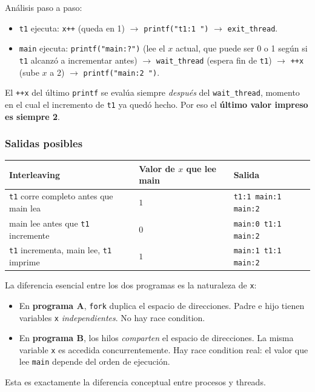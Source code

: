 \documentclass[11pt,a4paper]{article}
\begin{document}
Análisis paso a paso:

\begin{itemize}[leftmargin=*]
    \item \texttt{t1} ejecuta: \texttt{x++} (queda en 1) $\to$
        \texttt{printf("t1:1 ")} $\to$ \texttt{exit\_thread}.
    \item \texttt{main} ejecuta: \texttt{printf("main:?")} (lee el
        $x$ actual, que puede ser 0 o 1 según si \texttt{t1} alcanzó
        a incrementar antes) $\to$ \texttt{wait\_thread} (espera fin
        de \texttt{t1}) $\to$ \texttt{++x} (sube $x$ a 2) $\to$
        \texttt{printf("main:2 ")}.
\end{itemize}

El \texttt{++x} del último \texttt{printf} se evalúa siempre
\emph{después} del \texttt{wait\_thread}, momento en el cual el
incremento de \texttt{t1} ya quedó hecho. Por eso el \textbf{último
valor impreso es siempre 2}.

\subsubsection*{Salidas posibles}

\begin{center}
\small
\begin{tabular}{@{}lll@{}}
\toprule
Interleaving & Valor de $x$ que lee main & Salida \\
\midrule
\texttt{t1} corre completo antes que main lea  & $1$ & \texttt{t1:1 main:1 main:2\ } \\
main lee antes que \texttt{t1} incremente      & $0$ & \texttt{main:0 t1:1 main:2\ } \\
\texttt{t1} incrementa, main lee, \texttt{t1} imprime & $1$ & \texttt{main:1 t1:1 main:2\ } \\
\bottomrule
\end{tabular}
\end{center}

\begin{importante}
La diferencia esencial entre los dos programas es la naturaleza de
\texttt{x}:

\begin{itemize}[leftmargin=*,nosep]
    \item En \textbf{programa A}, \texttt{fork} duplica el espacio de
        direcciones. Padre e hijo tienen variables \texttt{x}
        \emph{independientes}. No hay race condition.
    \item En \textbf{programa B}, los hilos \emph{comparten} el
        espacio de direcciones. La misma variable \texttt{x} es
        accedida concurrentemente. Hay race condition real: el valor
        que lee \texttt{main} depende del orden de ejecución.
\end{itemize}

Esta es exactamente la diferencia conceptual entre procesos y
threads.
\end{importante}
\end{document}
